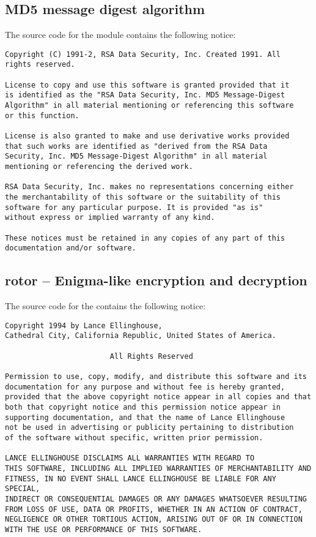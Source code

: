 \subsection{MD5 message digest algorithm}

The source code for the  module contains the following notice:

\begin{verbatim}
Copyright (C) 1991-2, RSA Data Security, Inc. Created 1991. All
rights reserved.

License to copy and use this software is granted provided that it
is identified as the "RSA Data Security, Inc. MD5 Message-Digest
Algorithm" in all material mentioning or referencing this software
or this function.

License is also granted to make and use derivative works provided
that such works are identified as "derived from the RSA Data
Security, Inc. MD5 Message-Digest Algorithm" in all material
mentioning or referencing the derived work.

RSA Data Security, Inc. makes no representations concerning either
the merchantability of this software or the suitability of this
software for any particular purpose. It is provided "as is"
without express or implied warranty of any kind.

These notices must be retained in any copies of any part of this
documentation and/or software.
\end{verbatim}



\subsection{rotor -- Enigma-like encryption and decryption}

The source code for the  contains the following notice:

\begin{verbatim}
Copyright 1994 by Lance Ellinghouse,
Cathedral City, California Republic, United States of America.

                        All Rights Reserved

Permission to use, copy, modify, and distribute this software and its 
documentation for any purpose and without fee is hereby granted, 
provided that the above copyright notice appear in all copies and that
both that copyright notice and this permission notice appear in 
supporting documentation, and that the name of Lance Ellinghouse
not be used in advertising or publicity pertaining to distribution 
of the software without specific, written prior permission.

LANCE ELLINGHOUSE DISCLAIMS ALL WARRANTIES WITH REGARD TO
THIS SOFTWARE, INCLUDING ALL IMPLIED WARRANTIES OF MERCHANTABILITY AND
FITNESS, IN NO EVENT SHALL LANCE ELLINGHOUSE BE LIABLE FOR ANY SPECIAL, 
INDIRECT OR CONSEQUENTIAL DAMAGES OR ANY DAMAGES WHATSOEVER RESULTING 
FROM LOSS OF USE, DATA OR PROFITS, WHETHER IN AN ACTION OF CONTRACT, 
NEGLIGENCE OR OTHER TORTIOUS ACTION, ARISING OUT OF OR IN CONNECTION 
WITH THE USE OR PERFORMANCE OF THIS SOFTWARE.
\end{verbatim}


